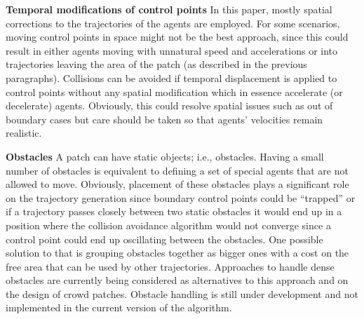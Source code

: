 \textbf{Temporal modifications of control points}
In this paper, mostly spatial corrections to the trajectories of the agents are employed.
For some scenarios, moving control points in space might not be the best approach, since this could result in either agents moving with unnatural speed and accelerations or into trajectories leaving the area of the patch (as described in the previous paragraphs).
Collisions can be avoided if temporal displacement is applied to control points without any spatial modification which in essence accelerate (or decelerate) agents.
Obviously, this could resolve spatial issues such as out of boundary cases but care should be taken so that agents' velocities remain realistic.




\textbf{Obstacles}
A patch can have static objects; i.e., obstacles.
Having a small number of obstacles is equivalent to defining a set of special agents that are not allowed to move.
Obviously, placement of these obstacles plays a significant role on the trajectory generation since boundary control points could be ``trapped'' or if a trajectory passes closely between two static obstacles it would end up in a position where the collision avoidance algorithm would not converge since a control point could end up oscillating between the obstacles.
One possible solution to that is grouping obstacles together as bigger ones with a cost on the free area that can be used by other trajectories.
Approaches to handle dense obstacles are currently being considered as alternatives to this approach and on the design of crowd patches.
Obstacle handling is still under development and not implemented in the current version of the algorithm.


